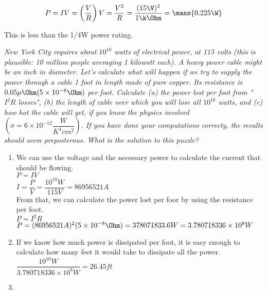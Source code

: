 \documentclass{article}
\begin{document}
    \[P = IV = \left(\dfrac{V}{R}\right)V = \dfrac{V^2}{R} = \frac{(15\V)^2}{1\k\Ohm} = \mans{0.225\W}\]
    
    This is less than the 1/4W power rating.

    \textit{New York City requires about $10^{10}$ watts of electrical power, at 115 volts (this is plausible: 10 million people averaging 1 kilowatt each). A heavy power cable might be an inch in diameter. Let's calculate what will happen if we try to supply the power through a cable 1 foot in length made of pure copper. Its resistance is $0.05\mu\Ohm  (5 \times 10^{-8} \Ohm)$ per foot. Calculate (a) the power lost per foot from "$I^2R$ losses", (b) the length of cable over which you will lose all $10^{10}$ watts, and (c) how hot the cable will get, if you know the physics involved $(\sigma = 6 \times 10^{-12} \dfrac{W}{K^4 cm^2})$. If you have done your computations correcty, the results should seem preposterous. What is the solution to this puzzle?}

    \begin{enumerate}
        \item
        We can use the voltage and the necessary power to calculate the current that should be flowing.\\

        $P = I V$ \\

        $I = \dfrac{P}{V} = \dfrac{10^{10} W} {115 V} = 86956521 A$ \\

       From that, we can calculate the power lost per foor by using the resistance per foot.\\

        $P = I^2 R$ \\

        $P = (86956521 A)^{2} (5 \times 10^{-8} \Ohm) = 378071833.6 W = 3.780718336 \times 10^{8} W$\\

        \item
        If we know how much power is dissipated per foot, it is easy enough to calculate how many feet it would take to dissipate all the power.\\

        $\dfrac{10^{10} W}{3.780718336 \times 10^{8} W} = 26.45 ft$\\

        \item

    \end{enumerate}
\end{document}
